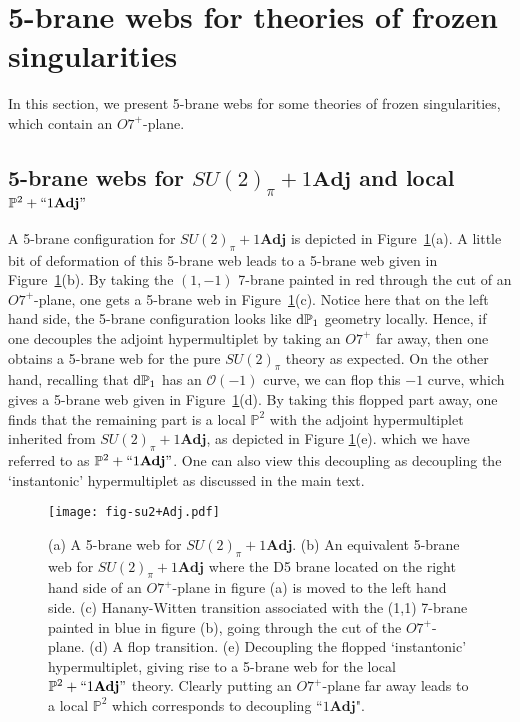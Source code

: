 \section{5-brane webs for theories of frozen singularities}\label{sec:appendix2}

In this section, we present 5-brane webs for some theories of frozen singularities, which contain an $O7^+$-plane. 

\subsection{\texorpdfstring{5-brane webs for $SU(2)_\pi+1\mathbf{Adj}$ and local $\mathbb{P}^2+``1\mathbf{Adj}"$}{5-brane webs for SU(2)pi + 1Adj and local P2 + 1Adj}}

A 5-brane configuration for $SU(2)_\pi+1\mathbf{Adj}$ is depicted in Figure~\ref{fig:su2+1adj}(a). A little bit of deformation of this 5-brane web leads to a 5-brane web given in Figure~\ref{fig:su2+1adj}(b). By taking the $(1,-1)$ 7-brane painted in red through the cut of an $O7^+$-plane, one gets a 5-brane web in Figure~\ref{fig:su2+1adj}(c). Notice here that on the left hand side, the 5-brane configuration looks like ${\rm d}\mathbb{P}_1$ geometry locally. Hence, if one decouples the adjoint hypermultiplet by taking an $O7^+$ far away, then one obtains a 5-brane web for the pure $SU(2)_\pi$ theory as expected. On the other hand, recalling that ${\rm d}\mathbb{P}_1$ has an $\mathcal{O}(-1)$ curve, we can flop this $-1$ curve, which gives a 5-brane web given in Figure~\ref{fig:su2+1adj}(d). By taking this flopped part away, one finds that the remaining part is a local $\mathbb{P}^2$ with the adjoint hypermultiplet inherited from $SU(2)_\pi+1\mathbf{Adj}$, as depicted in Figure \ref{fig:su2+1adj}(e). which we have referred to as $\mathbb{P}^2+``1\mathbf{Adj}"$. One can also view this decoupling as decoupling the `instantonic' hypermultiplet as discussed in the main text.
\begin{figure}
	\texttt{[image: fig-su2+Adj.pdf]}
	\centering	
	\caption{(a) A 5-brane web for $SU(2)_\pi+1\mathbf{Adj}$. (b) An equivalent 5-brane web for $SU(2)_\pi+1\mathbf{Adj}$ where the D5 brane located on the right hand side of an $O7^+$-plane in figure (a) is moved to the left hand side. (c) Hanany-Witten transition associated with the (1,1) 7-brane painted in blue in figure (b), going through the cut of the $O7^+$-plane. (d) A flop transition. (e) Decoupling the flopped `instantonic' hypermultiplet, giving rise to a 5-brane web for the local $\mathbb{P}^2+``1\mathbf{Adj}"$ theory. Clearly putting an $O7^+$-plane far away leads to a local $\mathbb{P}^2$ which corresponds to decoupling ``$1\mathbf{Adj}$". }
	\label{fig:su2+1adj}
\end{figure}


